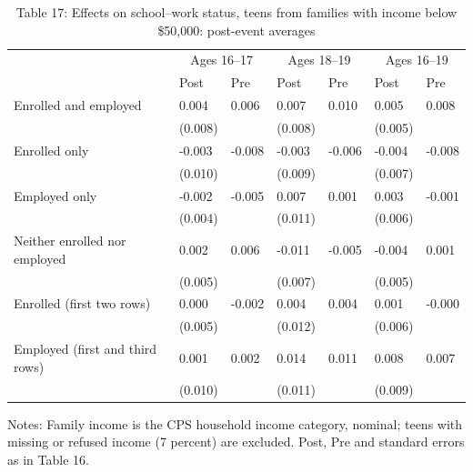 \documentclass[12pt]{article}
\begin{document}
\begin{table}
\centering
\caption{Table 17: Effects on school--work status, teens from families with income below \$50,000: post-event averages}

\small
\begin{tabular}{p{}p{}p{}p{}p{}p{}p{}}
\toprule
 & \multicolumn{2}{c}{Ages 16--17} & \multicolumn{2}{c}{Ages 18--19} & \multicolumn{2}{c}{Ages 16--19} \\

 & Post & Pre & Post & Pre & Post & Pre \\
\midrule
Enrolled and employed & 0.004 & 0.006 & 0.007 & 0.010 & 0.005 & 0.008 \\
 & (0.008) &  & (0.008) &  & (0.005) &  \\
Enrolled only & -0.003 & -0.008 & -0.003 & -0.006 & -0.004 & -0.008 \\
 & (0.010) &  & (0.009) &  & (0.007) &  \\
Employed only & -0.002 & -0.005 & 0.007 & 0.001 & 0.003 & -0.001 \\
 & (0.004) &  & (0.011) &  & (0.006) &  \\
Neither enrolled nor employed & 0.002 & 0.006 & -0.011 & -0.005 & -0.004 & 0.001 \\
 & (0.005) &  & (0.007) &  & (0.005) &  \\
Enrolled (first two rows) & 0.000 & -0.002 & 0.004 & 0.004 & 0.001 & -0.000 \\
 & (0.005) &  & (0.012) &  & (0.006) &  \\
Employed (first and third rows) & 0.001 & 0.002 & 0.014 & 0.011 & 0.008 & 0.007 \\
 & (0.010) &  & (0.011) &  & (0.009) &  \\
\bottomrule
\end{tabular}



\noindent\small Notes: Family income is the CPS household income category, nominal; teens with missing or refused income (7 percent) are excluded. Post, Pre and standard errors as in Table 16.

\end{table}
\end{document}
